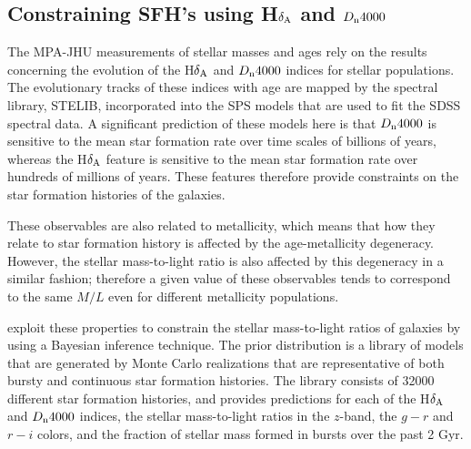 \subsection{Constraining SFH's using H$\delta_{\rm A}$ and $D_{\rm n}4000$}
\label{kauffmann method}

The MPA-JHU measurements of stellar masses and ages rely on the 
results concerning the evolution of the H$\delta_{\rm A}$ and 
$D_{\rm n}4000$ indices for stellar populations. The evolutionary 
tracks of these indices with age are mapped by the spectral library, 
STELIB, incorporated into the SPS models \citep{bruzual_stellar_2003} 
that are used to fit the SDSS spectral data. 
A significant prediction of these models here is that 
$D_{\rm n}4000$ is sensitive to the mean star formation rate over
time scales of billions of years, whereas the H$\delta_{\rm A}$ feature 
is sensitive to the mean star formation rate over hundreds of millions
of years. These features therefore provide constraints on the star
formation histories of the galaxies.

These observables are also related to metallicity, which means that
how they relate to star formation history is affected by the
age-metallicity degeneracy. However, the stellar mass-to-light ratio is 
also affected by this degeneracy in a similar fashion; therefore
a given value of these observables tends to correspond to the 
same $M/L$ even for different metallicity populations.

\citet{kauffmann2013} exploit these properties to constrain the 
stellar mass-to-light ratios of galaxies by using a Bayesian 
inference technique. The prior distribution is a library of models 
that are generated by Monte Carlo realizations that are 
representative of both bursty and continuous star formation 
histories. The library consists of 32000 different star formation 
histories, and provides predictions for each of the H$\delta_{\rm A}$ 
and $D_{\rm n}4000$ indices, the stellar mass-to-light ratios in the 
$z$-band, the $g-r$ and $r-i$ colors, and the fraction of stellar 
mass formed in bursts over the past 2 Gyr.\\

